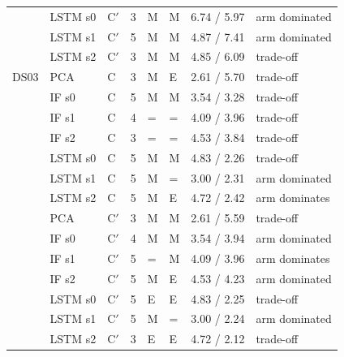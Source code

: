 \begin{scriptsize}
\begin{longtable}{lllrllll}
 & LSTM s0 & C$'$ & 3 & M & M & 6.74 / 5.97 & arm dominated \\
 & LSTM s1 & C$'$ & 5 & M & M & 4.87 / 7.41 & arm dominated \\
 & LSTM s2 & C$'$ & 3 & M & M & 4.85 / 6.09 & trade-off \\
\midrule
DS03 & PCA & C & 3 & M & E & 2.61 / 5.70 & trade-off \\
 & IF s0 & C & 5 & M & M & 3.54 / 3.28 & trade-off \\
 & IF s1 & C & 4 & = & = & 4.09 / 3.96 & trade-off \\
 & IF s2 & C & 3 & = & = & 4.53 / 3.84 & trade-off \\
 & LSTM s0 & C & 5 & M & M & 4.83 / 2.26 & trade-off \\
 & LSTM s1 & C & 5 & M & = & 3.00 / 2.31 & arm dominated \\
 & LSTM s2 & C & 5 & M & E & 4.72 / 2.42 & arm dominates \\
 & PCA & C$'$ & 3 & M & M & 2.61 / 5.59 & trade-off \\
 & IF s0 & C$'$ & 4 & M & M & 3.54 / 3.94 & arm dominated \\
 & IF s1 & C$'$ & 5 & = & M & 4.09 / 3.96 & arm dominates \\
 & IF s2 & C$'$ & 5 & M & E & 4.53 / 4.23 & arm dominated \\
 & LSTM s0 & C$'$ & 5 & E & E & 4.83 / 2.25 & trade-off \\
 & LSTM s1 & C$'$ & 5 & M & = & 3.00 / 2.24 & arm dominated \\
 & LSTM s2 & C$'$ & 3 & E & E & 4.72 / 2.12 & trade-off \\
\end{longtable}
\end{scriptsize}
